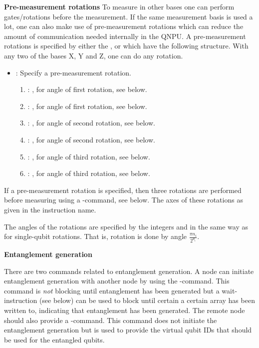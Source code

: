 \textbf{Pre-measurement rotations}
To measure in other bases one can perform gates/rotations before the measurement.
If the same measurement basis is used a lot, one can also make use of pre-measurement rotations which can reduce the amount of communication needed internally in the \ac{QNPU}.
A pre-measurement rotations is specified by either the ,  or  which have the following structure.
With any two of the bases X, Y and Z, one can do any rotation.
\begin{itemize}
  \item {}: Specify a pre-measurement rotation.
        \begin{enumerate}
          \item \IMMEDIATE: , for angle of first rotation, see below.
          \item \IMMEDIATE: , for angle of first rotation, see below.
          \item \IMMEDIATE: , for angle of second rotation, see below.
          \item \IMMEDIATE: , for angle of second rotation, see below.
          \item \IMMEDIATE: , for angle of third rotation, see below.
          \item \IMMEDIATE: , for angle of third rotation, see below.
        \end{enumerate}
\end{itemize}
If a pre-measurement rotation is specified, then three rotations are performed before measuring using a -command, see below.
The axes of these rotations as given in the instruction name.

The angles of the rotations are specified by the integers  and  in the same way as for single-qubit rotations.
That is, rotation  is done by angle $\frac{\pi n_i}{2^{d_i}}$.

\textbf{Entanglement generation}

There are two commands related to entanglement generation.
A node can initiate entanglement generation with another node by using the -command.
This command is \emph{not} blocking until entanglement has been generated but a wait-instruction (see below) can be used to block until certain a certain array has been written to, indicating that entanglement has been generated.
The remote node should also provide a -command.
This command does not initiate the entanglement generation but is used to provide the virtual qubit IDs that should be used for the entangled qubits.

